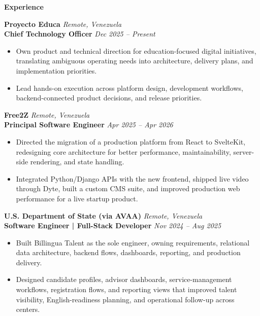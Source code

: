 \documentclass[11pt]{article}
\begin{document}
\vspace{8pt}
\begin{center}
    \textbf{Experience}
\end{center}
\vspace{-4pt}
\textbf{Proyecto Educa} \hfill \textit{Remote, Venezuela} \\
\textbf{Chief Technology Officer} \hfill \textit{Dec 2025 -- Present}
\begin{itemize}
    \item Own product and technical direction for education-focused digital initiatives, translating ambiguous operating needs into architecture, delivery plans, and implementation priorities.
    \item Lead hands-on execution across platform design, development workflows, backend-connected product decisions, and release priorities.
\end{itemize}
\vspace{8pt}
\textbf{Free2Z} \hfill \textit{Remote, Venezuela} \\
\textbf{Principal Software Engineer} \hfill \textit{Apr 2025 -- Apr 2026}
\begin{itemize}
    \item Directed the migration of a production platform from React to SvelteKit, redesigning core architecture for better performance, maintainability, server-side rendering, and state handling.
    \item Integrated Python/Django APIs with the new frontend, shipped live video through Dyte, built a custom CMS suite, and improved production web performance for a live startup product.
\end{itemize}
\vspace{8pt}
\textbf{U.S. Department of State (via AVAA)} \hfill \textit{Remote, Venezuela} \\
\textbf{Software Engineer | Full-Stack Developer} \hfill \textit{Nov 2024 -- Aug 2025}
\begin{itemize}
    \item Built Billingua Talent as the sole engineer, owning requirements, relational data architecture, backend flows, dashboards, reporting, and production delivery.
    \item Designed candidate profiles, advisor dashboards, service-management workflows, registration flows, and reporting views that improved talent visibility, English-readiness planning, and operational follow-up across centers.
\end{itemize}
\vspace{8pt}
\end{document}
